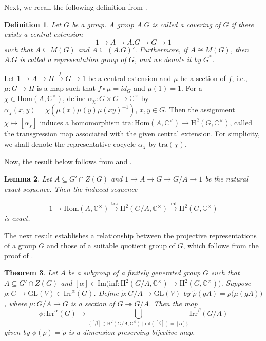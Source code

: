 \documentclass[a4paper,11pt]{amsart}
\numberwithin{equation}{section}
\numberwithin{equation}{subsection}
\newtheorem{theorem}{Theorem}[section]
\newtheorem{lemma}[theorem]{Lemma}
\newtheorem{definition}[theorem]{Definition}
\newcommand{\C}{\mathbb{C}}
\newcommand{\poonam}[1]{{\color{blue} #1}}
\begin{document}
	Next, we recall the following definition from \cite{gonzalo}. %
	\begin{definition} \label{covering group}
		Let $G$ be a group. A group $A.G$ is called a covering of $G$ if there exists a central extension
		\[
		1 \to A \to A.G \to G \to 1
		\]
		such that $A \subseteq M(G)$ and $A \subseteq (A.G)'$. 
		Furthermore, if $A \cong M(G)$, then $A.G$ is called a representation group of $G$, and we denote it by  $G^*$.
	\end{definition} 
	Let $1 \to A \to H \xrightarrow{f} G \to 1$ be a central extension and $\mu$ be a section of $f$, i.e., $\mu: G \to H$ is a map such that $f \circ \mu =id_G$ and $\mu(1)= 1$. 
	For a $\chi \in \mathrm{Hom}(A, \mathbb{C}^{\times})$, define 
	$\alpha_\chi : G \times G \to \mathbb{C}^{\times}$ by $\alpha_\chi(x, y) = \chi(\mu(x)\mu(y)\mu(xy)^{-1})$, $x,y \in G$. Then the assignment $\chi \mapsto [\alpha_\chi]$ induces a homomorphism $\mathrm{tra}: \mathrm{Hom}(A, \mathbb{C}^{\times}) \to \mathrm{H}^2(G, \mathbb{C}^{\times})$, called the transgression map associated with the given central extension. For simplicity, we shall denote the representative cocycle $\alpha_\chi$ by $\mathrm{tra}(\chi)$. 
	
	Now, the result below follows from \cite[Chapter 2, Theorem 2.5]{karpilovsky} and \cite[Proposition 2.1.7]{schurmultiplier}.
	\begin{lemma} \label{exact sequence}
		Let $A \subseteq G' \cap Z(G)$ and $1 \to A \to G \to G/A \to 1$ be the natural exact sequence. 
		Then the induced sequence
		
		$$ 1  \xrightarrow{}\mathrm{Hom}(A,\mathbb{C}^{\times}) 
		\xrightarrow{\mathrm{tra}} 
		\mathrm{H}^2(G/A,\mathbb{C}^{\times}) 
		\xrightarrow{\mathrm{inf}} \mathrm{H}^2(G,\mathbb{C}^{\times})$$
		is exact.
		
	\end{lemma}
	
	The next result establishes a relationship between the projective representations of a group $G$ and those of a suitable quotient group of $G$,
	which follows from the proof of \cite[Theorem 3.2]{hatui}.
	\begin{theorem} \label{bijective correspondence via inflation}
		Let $A$ be a subgroup of a finitely generated group $G$ such that $A \subseteq G' \cap Z(G)$ and $[\alpha] \in \mathrm { Im } \big(\mathrm{inf}: \mathrm{H}^2(G/A, \C^{\times}) \to \mathrm{H}^2(G, \C^{\times})\big)$. Suppose $\rho : G \to \mathrm{GL}(V) \in \mathrm{Irr}^\alpha(G)$.
		Define $\tilde{\rho} : G/A \to \mathrm{GL}(V)$ by 
		$\tilde{\rho}(gA) = \rho\big(\mu(gA)\big)$, where $\mu : G/A \to G$ is a section of $G \twoheadrightarrow G/A$.
		Then the map
		\[
		\phi : \mathrm{Irr}^\alpha(G) \longrightarrow 
		\bigcup_{\{[\beta] \in \mathrm{H}^2(G/A, \mathbb{C}^{\times}) \mid \mathrm{inf}([\beta]) = [\alpha]\}} 
		\mathrm{Irr}^\beta(G/A)
		\]
		given by $\phi(\rho) = \tilde{\rho}$ is a dimension-preserving bijective map. 
	\end{theorem} 
	
\end{document}
